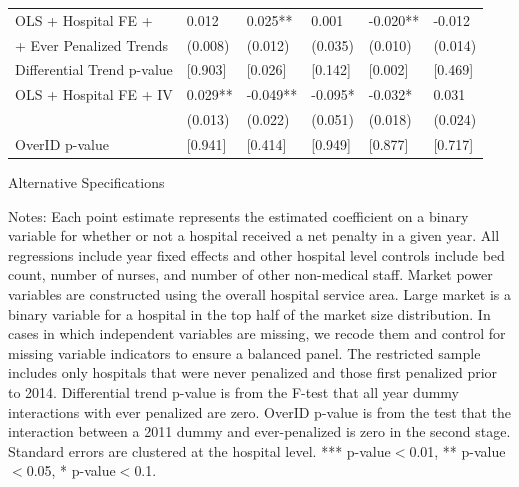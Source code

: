 \documentclass[12pt]{article}
\begin{document}
{\begin{tabular}{llllll}
\hspace{0.05in}OLS	+ Hospital FE +			&	0.012		&	0.025**			&	0.001			&	-0.020**		&	-0.012		\\
\hspace{0.1in} + Ever Penalized Trends		&	(0.008)		&	(0.012)			&	(0.035)			&	(0.010)			&	(0.014)		\\
\hspace{0.1in} Differential Trend p-value 	&	[0.903]		&	[0.026]			&	[0.142]			&	[0.002]			&	[0.469]		\\
\hspace{0.05in}OLS	+ Hospital FE +	IV		&	0.029**		&	-0.049**		&	-0.095*			&	-0.032*			&	0.031		\\
											&	(0.013)		&	(0.022)			&	(0.051)			&	(0.018)			&	(0.024)		\\
\hspace{0.1in} OverID p-value			 	&	[0.941]		&	[0.414]			&	[0.949]			&	[0.877]			&	[0.717]		\\
\hline
\end{tabular}
}
\setlength{\captionmargin}{.5 \textwidth} \addtolength{\captionmargin}{-.5\wd\gfxbox}
\begin{table}[htbp!]
\centering
\caption{Alternative Specifications}
\label{tab:extraresults}
\usebox{\gfxbox}
\par
\begin{minipage}{\wd\gfxbox}
\footnotesize
Notes: Each point estimate represents the estimated coefficient on a binary variable for whether or not a hospital received a net penalty in a given year.  All regressions include year fixed effects and other hospital level controls include bed count, number of nurses, and number of other non-medical staff.  Market power variables are constructed using the overall hospital service area.  Large market is a binary variable for a hospital in the top half of the market size distribution.  In cases in which independent variables are missing, we recode them and control for missing variable indicators to ensure a balanced panel.  The restricted sample includes only hospitals that were never penalized and those first penalized prior to 2014.  Differential trend p-value is from the F-test that all year dummy interactions with ever penalized are zero.  OverID p-value is from the test that the interaction between a 2011 dummy and ever-penalized is zero in the second stage.  Standard errors are clustered at the hospital level.  *** p-value$<$0.01, ** p-value$<$0.05, * p-value$<$0.1.
\end{minipage}
\end{table}
\end{document}
